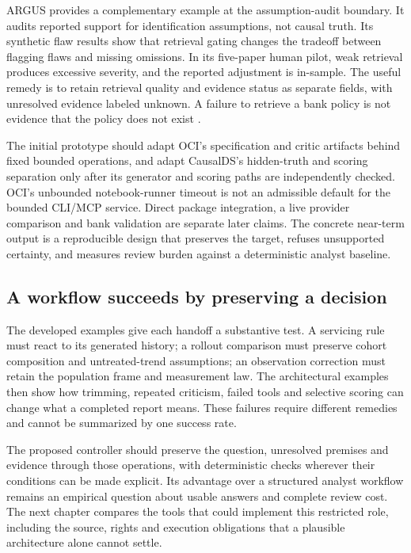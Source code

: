 ARGUS provides a complementary example at the assumption-audit boundary. It
audits reported support for identification assumptions, not causal truth. Its
synthetic flaw results show that retrieval gating changes the tradeoff between
flagging flaws and missing omissions. In its five-paper human pilot, weak
retrieval produces excessive severity, and the reported adjustment is in-sample.
The useful remedy is to retain retrieval quality and evidence status as separate
fields, with unresolved evidence labeled unknown. A failure to retrieve a bank
policy is not evidence that the policy does not exist
\citep{v12_la_2609_30867}.

The initial prototype should adapt OCI's specification and critic artifacts
behind fixed bounded operations, and adapt CausalDS's hidden-truth and scoring
separation only after its generator and scoring paths are independently checked.
OCI's unbounded notebook-runner timeout is not an admissible default for the
bounded CLI/MCP service. Direct package integration, a live provider comparison
and bank validation are separate later claims. The concrete near-term output is
a reproducible design that preserves the target, refuses unsupported certainty,
and measures review burden against a deterministic analyst baseline.
\subsection{A workflow succeeds by preserving a decision}

The developed examples give each handoff a substantive test. A servicing rule
must react to its generated history; a rollout comparison must preserve cohort
composition and untreated-trend assumptions; an observation correction must
retain the population frame and measurement law. The architectural examples
then show how trimming, repeated criticism, failed tools and selective scoring
can change what a completed report means. These failures require different
remedies and cannot be summarized by one success rate.

The proposed controller should preserve the question, unresolved premises and
evidence through those operations, with deterministic checks wherever their
conditions can be made explicit. Its advantage over a structured analyst
workflow remains an empirical question about usable answers and complete
review cost. The next chapter compares the tools that could implement this
restricted role, including the source, rights and execution obligations that
a plausible architecture alone cannot settle.
\label{exec14:estimation-validation-end}

